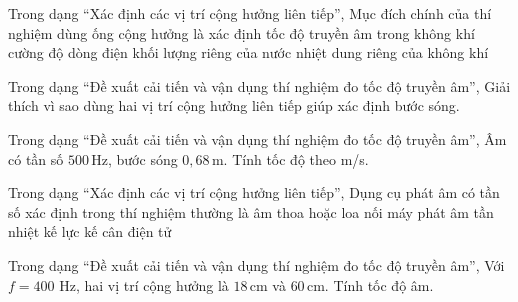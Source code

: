 \begin{ex}
Trong dạng “Xác định các vị trí cộng hưởng liên tiếp”, Mục đích chính của thí nghiệm dùng ống cộng hưởng là xác định
\choice
{\True tốc độ truyền âm trong không khí}
{cường độ dòng điện}
{khối lượng riêng của nước}
{nhiệt dung riêng của không khí}
\end{ex}

\begin{ex}
Trong dạng “Đề xuất cải tiến và vận dụng thí nghiệm đo tốc độ truyền âm”, Giải thích vì sao dùng hai vị trí cộng hưởng liên tiếp giúp xác định bước sóng.
\choiceTF

\end{ex}

\begin{ex}
Trong dạng “Đề xuất cải tiến và vận dụng thí nghiệm đo tốc độ truyền âm”, Âm có tần số $500\,\text{Hz}$, bước sóng $0,68\,\text{m}$. Tính tốc độ theo m/s.
\end{ex}

\begin{ex}
Trong dạng “Xác định các vị trí cộng hưởng liên tiếp”, Dụng cụ phát âm có tần số xác định trong thí nghiệm thường là
\choice
{\True âm thoa hoặc loa nối máy phát âm tần}
{nhiệt kế}
{lực kế}
{cân điện tử}
\end{ex}

\begin{ex}
Trong dạng “Đề xuất cải tiến và vận dụng thí nghiệm đo tốc độ truyền âm”, Với $f=400$ Hz, hai vị trí cộng hưởng là $18\,\text{cm}$ và $60\,\text{cm}$. Tính tốc độ âm.
\choiceTF

\end{ex}

